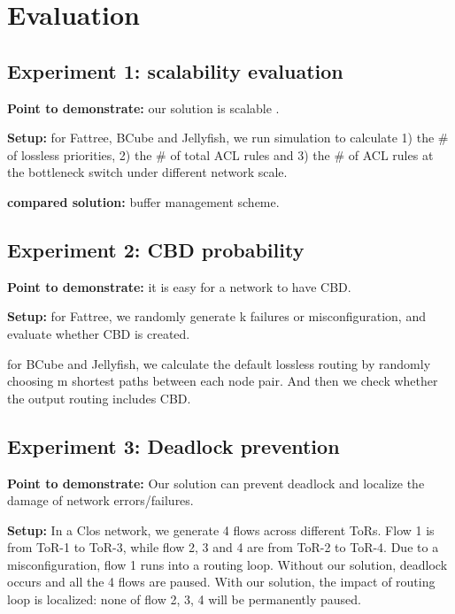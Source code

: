 \section{Evaluation}\label{sec:eval}

\subsection{Experiment 1: scalability evaluation}\label{subsec:exp_scalability}

\textbf{Point to demonstrate:} our solution is scalable .

\textbf{Setup:} for Fattree, BCube and Jellyfish, we run simulation to calculate 1) the $\#$ of lossless priorities, 2) the $\#$ of total ACL rules and 3) the $\#$ of ACL rules at the bottleneck switch under different network scale.

 \textbf{compared solution:} buffer management scheme.
 
 \subsection{Experiment 2: CBD probability}\label{subsec:exp_CBDprobability}
 
 \textbf{Point to demonstrate:} it is easy for a network to have CBD.
 
 \textbf{Setup:} for Fattree, we randomly generate k failures or misconfiguration, and evaluate whether CBD is created.
 
  for BCube and Jellyfish, we calculate the default lossless routing by randomly choosing m shortest paths between each node pair. And then we check whether the output routing includes CBD.
 
\subsection{Experiment 3: Deadlock prevention}\label{subsec:exp_deadlockprevention}

\textbf{Point to demonstrate:} Our solution can prevent deadlock and localize the damage of network errors/failures.

\textbf{Setup:} In a Clos network, we generate 4 flows across different ToRs. Flow 1 is from ToR-1 to ToR-3, while flow 2, 3 and 4 are from ToR-2 to ToR-4. Due to a misconfiguration, flow 1 runs into a routing loop. Without our solution, deadlock occurs and all the 4 flows are paused. With our solution, the impact of routing loop is localized: none of flow 2, 3, 4 will be permanently paused.

